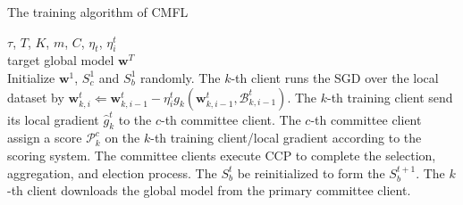 \documentclass[10pt,journal,compsoc]{IEEEtran}
\newcommand{\w}{\mathbf{w}}
\newcommand{\B}{\mathcal{B}}
\newcommand{\p}{\mathcal{P}}
\begin{document}
\begin{algorithm}
\caption{The training algorithm of CMFL}
\begin{algorithmic}[1]
\label{algorithm_CMFL}
\REQUIRE $\tau$, $T$, $K$, $m$, $C$, $\eta_t$, $\eta_i^t$\\ %
\ENSURE target global model $\w^T$\\ %
\STATE Initialize $\w^{1}$, $S_c^{1}$ and $S_b^{1}$ randomly.
\STATE The $k$-th client runs the SGD over the local dataset by $\w_{k,i}^{t} \Leftarrow \w_{k,i-1}^{t} - \eta_i^t g_{k}(\w_{k,i-1}^{t},\B_{k,i-1}^{t})$.
\ENDFOR
\ENDFOR
{}
\STATE The $k$-th training client send its local gradient $\hat{g}_k^{t}$ to the $c$-th committee client.
\STATE The $c$-th committee client assign a score $\p_k^c$ on the $k$-th training client/local gradient according to the scoring system.
\ENDFOR
\ENDFOR
\STATE The committee clients execute CCP to complete the selection, aggregation, and election process.
\STATE The $S_b^{t}$ be reinitialized to form the $S_b^{t+1}$.
\STATE The $k$-th client downloads the global model from the primary committee client.
\ENDFOR
\ENDFOR
\end{algorithmic}
\end{algorithm}
\end{document}
